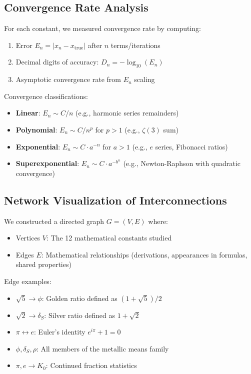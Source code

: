 \documentclass[11pt,a4paper]{article}
\begin{document}
\subsection{Convergence Rate Analysis}

For each constant, we measured convergence rate by computing:
\begin{enumerate}
    \item Error $E_n = |x_n - x_{\text{true}}|$ after $n$ terms/iterations
    \item Decimal digits of accuracy: $D_n = -\log_{10}(E_n)$
    \item Asymptotic convergence rate from $E_n$ scaling
\end{enumerate}

Convergence classifications:
\begin{itemize}
    \item \textbf{Linear}: $E_n \sim C/n$ (e.g., harmonic series remainders)
    \item \textbf{Polynomial}: $E_n \sim C/n^p$ for $p > 1$ (e.g., $\zeta(3)$ sum)
    \item \textbf{Exponential}: $E_n \sim C \cdot a^{-n}$ for $a > 1$ (e.g., $e$ series, Fibonacci ratios)
    \item \textbf{Superexponential}: $E_n \sim C \cdot a^{-b^n}$ (e.g., Newton-Raphson with quadratic convergence)
\end{itemize}

\subsection{Network Visualization of Interconnections}

We constructed a directed graph $G = (V, E)$ where:
\begin{itemize}
    \item Vertices $V$: The 12 mathematical constants studied
    \item Edges $E$: Mathematical relationships (derivations, appearances in formulas, shared properties)
\end{itemize}

Edge examples:
\begin{itemize}
    \item $\sqrt{5} \to \phi$: Golden ratio defined as $(1 + \sqrt{5})/2$
    \item $\sqrt{2} \to \delta_S$: Silver ratio defined as $1 + \sqrt{2}$
    \item $\pi \leftrightarrow e$: Euler's identity $e^{i\pi} + 1 = 0$
    \item $\phi, \delta_S, \rho$: All members of the metallic means family
    \item $\pi, e \to K_0$: Continued fraction statistics
\end{itemize}
\end{document}
